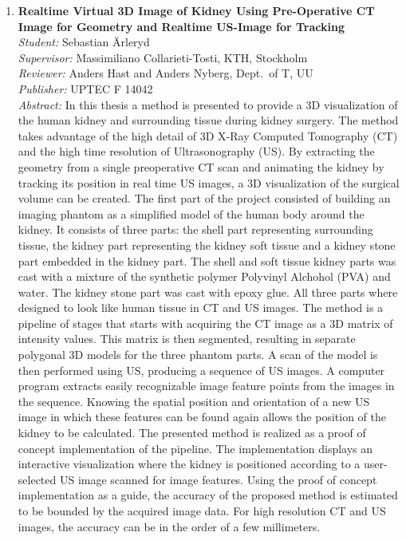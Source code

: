 \begin{small}
\begin{enumerate}
\item\textbf{Realtime Virtual 3D Image of Kidney Using Pre-Operative CT Image for Geometry and Realtime US-Image for Tracking}\\
  \emph{Student:} Sebastian \"{A}rleryd\\
  \emph{Supervisor:} Massimiliano Collarieti-Tosti, KTH, Stockholm\\ 
  \emph{Reviewer:} Anders Hast and Anders Nyberg, Dept.~of T, UU\\
  \emph{Publisher:} UPTEC F 14042\\
  \emph{Abstract:} In this thesis a method is presented to provide a 3D visualization of the human kidney and surrounding tissue during kidney surgery. The method takes advantage of the high detail of 3D X-Ray Computed Tomography (CT) and the high time resolution of Ultrasonography (US). By extracting the geometry from a single preoperative CT scan and animating the kidney by tracking its position in real time US images, a 3D visualization of the surgical volume can be created. The first part of the project consisted of building an imaging phantom as a simplified model of the human body around the kidney. It consists of three parts: the shell part representing surrounding tissue, the kidney part representing the kidney soft tissue and a kidney stone part embedded in the kidney part. The shell and soft tissue kidney parts was cast with a mixture of the synthetic polymer Polyvinyl Alchohol (PVA) and water. The kidney stone part was cast with epoxy glue. All three parts where designed to look like human tissue in CT and US images. The method is a pipeline of stages that starts with acquiring the CT image as a 3D matrix of intensity values. This matrix is then segmented, resulting in separate polygonal 3D models for the three phantom parts. A scan of the model is then performed using US, producing a sequence of US images. A computer program extracts easily recognizable image feature points from the images in the sequence. Knowing the spatial position and orientation of a new US image in which these features can be found again allows the position of the kidney to be calculated. The presented method is realized as a proof of concept implementation of the pipeline. The implementation displays an interactive visualization where the kidney is positioned according to a user-selected US image scanned for image features. Using the proof of concept implementation as a guide, the accuracy of the proposed method is estimated to be bounded by the acquired image data. For high resolution CT and US images, the accuracy can be in the order of a few millimeters. 


\end{enumerate}
\end{small}
